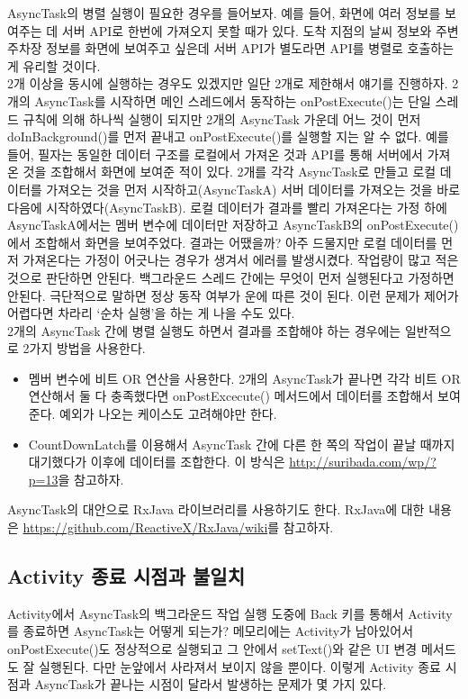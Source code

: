 AsyncTask의 병렬 실행이 필요한 경우를 들어보자. 
예를 들어, 화면에 여러 정보를 보여주는 데 서버 API로 한번에 가져오지 못할 때가 있다. 도착 지점의 날씨 정보와 주변 주차장 정보를 화면에 보여주고 싶은데 서버 API가 별도라면 API를 병렬로 호출하는 게 유리할 것이다.\\

2개 이상을 동시에 실행하는 경우도 있겠지만 일단 2개로 제한해서 얘기를 진행하자.   
2개의 AsyncTask를 시작하면 메인 스레드에서 동작하는 onPostExecute()는 단일 스레드 규칙에 의해 하나씩 실행이 되지만 2개의 AsyncTask 가운데 어느 것이 먼저 doInBackground()를 먼저 끝내고 onPostExecute()를 실행할 지는 알 수 없다. 
예를 들어, 필자는 동일한 데이터 구조를 로컬에서 가져온 것과 API를 통해 서버에서 가져온 것을 조합해서 화면에 보여준 적이 있다. 
2개를 각각 AsyncTask로 만들고 로컬 데이터를 가져오는 것을 먼저 시작하고(AsyncTaskA) 서버 데이터를 가져오는 것을 바로 다음에 시작하였다(AsyncTaskB). 
로컬 데이터가 결과를 빨리 가져온다는 가정 하에 AsyncTaskA에서는 멤버 변수에 데이터만 저장하고 AsyncTaskB의 onPostExecute()에서 조합해서 화면을 보여주었다.
결과는 어땠을까? 아주 드물지만 로컬 데이터를 먼저 가져온다는 가정이 어긋나는 경우가 생겨서 에러를 발생시켰다. 
작업량이 많고 적은 것으로 판단하면 안된다.
백그라운드 스레드 간에는 무엇이 먼저 실행된다고 가정하면 안된다. 극단적으로 말하면 정상 동작 여부가 운에 따른 것이 된다.
이런 문제가 제어가 어렵다면 차라리 `순차 실행'을 하는 게 나을 수도 있다.\\

2개의 AsyncTask 간에 병렬 실행도 하면서 결과를 조합해야 하는 경우에는 일반적으로 2가지 방법을 사용한다.
\begin{itemize}
\item 멤버 변수에 비트 OR 연산을 사용한다. 2개의 AsyncTask가 끝나면 각각 비트 OR 연산해서 둘 다 충족했다면 onPostExcecute() 메서드에서 데이터를 조합해서 보여준다. 예외가 나오는 케이스도 고려해야만 한다. 
\item CountDownLatch를 이용해서 AsyncTask 간에 다른 한 쪽의 작업이 끝날 때까지 대기했다가 이후에 데이터를 조합한다. 이 방식은 \url{http://suribada.com/wp/?p=13}을 참고하자.
\end{itemize}

AsyncTask의 대안으로 RxJava 라이브러리를 사용하기도 한다. RxJava에 대한 내용은 \url{https://github.com/ReactiveX/RxJava/wiki}를 참고하자.

\subsection{Activity 종료 시점과 불일치}
Activity에서 AsyncTask의 백그라운드 작업 실행 도중에 Back 키를 통해서 Activity를 종료하면 AsyncTask는 어떻게 되는가? 메모리에는 Activity가 남아있어서 onPostExecute()도 정상적으로 실행되고 그 안에서 setText()와 같은 UI 변경 메서드도 잘 실행된다. 다만 눈앞에서 사라져서 보이지 않을 뿐이다.
이렇게 Activity 종료 시점과 AsyncTask가 끝나는 시점이 달라서 발생하는 문제가 몇 가지 있다.\\

